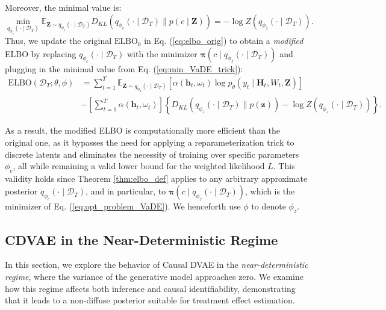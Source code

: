 \documentclass[10pt]{article} %
\begin{document}
Moreover, the minimal value is:
\begin{equation}
\label{eq:min_VaDE_trick}
    \min_{q_{\phi_c}(\cdot \mid \mathcal{D}_T)} \mathbb{E}_{\mathbf{Z} \sim q_{\phi_z}(\cdot \mid \mathcal{D}_T)} D_{KL}(q_{\phi_c}(\cdot \mid \mathcal{D}_T) \parallel p(c \mid \mathbf{Z})) = -\log Z(q_{\phi_z}(\cdot \mid \mathcal{D}_T)).
\end{equation}
Thus, we update the original \(\mathrm{ELBO}_0\) in Eq. (\ref{eq:elbo_orig}) to obtain a \emph{modified} ELBO by replacing \(q_{\phi_c}(\cdot \mid \mathcal{D}_T)\) with the minimizer \(\mathbf{\pi}(c \mid q_{\phi_z}(\cdot \mid \mathcal{D}_T))\) and plugging in the minimal value from Eq. (\ref{eq:min_VaDE_trick}):
\begin{equation}
\label{eq:welbo_def}
\begin{split}
\mathrm{ELBO}(\mathcal{D}_T; \theta, \phi) &=  \sum_{t = 1}^{T} \mathbb{E}_{\mathbf{Z} \sim q_{\phi_z}(\cdot \mid \mathcal{D}_T)} 
\left[ \alpha(\mathbf{h}_t, \omega_t) \log p_{\theta}(y_{t} \mid \mathbf{H}_t, W_t, \mathbf{Z}) \right] \\
&- \left[\sum_{t = 1}^{T}\alpha(\mathbf{h}_t, \omega_t)\right] \left\{D_{KL}(q_{\phi_z}(\cdot \mid \mathcal{D}_T) \parallel p(\mathbf{z})) - \log Z(q_{\phi_z}(\cdot \mid \mathcal{D}_T))\right\}.
\end{split}
\end{equation}

As a result, the modified ELBO is computationally more efficient than the original one, as it bypasses the need for applying a reparameterization trick to discrete latents and eliminates the necessity of training over specific parameters \(\phi_c\), all while remaining a valid lower bound for the weighted likelihood \(L\). This validity holds since Theorem \ref{thm:elbo_def} applies to any arbitrary approximate posterior \(q_{\phi_c}(\cdot \mid \mathcal{D}_T)\), and in particular, to \(\mathbf{\pi}(c \mid q_{\phi_z}(\cdot \mid \mathcal{D}_T))\), which is the minimizer of Eq. (\ref{eq:opt_problem_VaDE}).  We henceforth use \(\phi\) to denote \(\phi_z\). 


\subsection{CDVAE in the Near-Deterministic Regime}
\label{sect:cdvae_near_det}
In this section, we explore the behavior of Causal DVAE in the \emph{near-deterministic regime}, where the variance of the generative model approaches zero. We examine how this regime affects both inference and causal identifiability, demonstrating that it leads to a non-diffuse posterior suitable for treatment effect estimation. 
\end{document}
